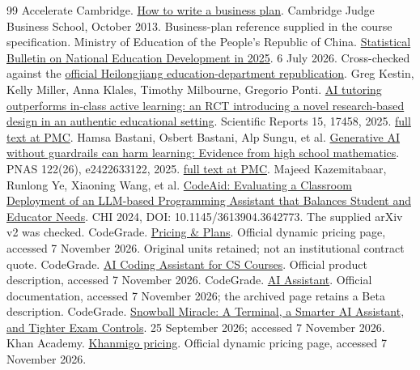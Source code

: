 \begin{thebibliography}{99}
 Accelerate Cambridge. \href{https://www.jbs.cam.ac.uk/wp-content/uploads/2020/08/how-to-write-a-business-plan.pdf}{How to write a business plan}. Cambridge Judge Business School, October 2013. Business-plan reference supplied in the course specification.
 Ministry of Education of the People's Republic of China. \href{https://www.moe.gov.cn/jyb_sjzl/sjzl_fztjgb/202607/t20260706_1442870.html}{Statistical Bulletin on National Education Development in 2025}. 6 July 2026. Cross-checked against the \href{https://jyt.hlj.gov.cn/jyt/c110518/202608/c00_31969727.shtml}{official Heilongjiang education-department republication}.
 Greg Kestin, Kelly Miller, Anna Klales, Timothy Milbourne, Gregorio Ponti. \href{https://doi.org/10.1038/s41598-025-97652-6}{AI tutoring outperforms in-class active learning: an RCT introducing a novel research-based design in an authentic educational setting}. Scientific Reports 15, 17458, 2025. \href{https://pmc.ncbi.nlm.nih.gov/articles/PMC12179260/}{full text at PMC}.
 Hamsa Bastani, Osbert Bastani, Alp Sungu, et al. \href{https://doi.org/10.1073/pnas.2422633122}{Generative AI without guardrails can harm learning: Evidence from high school mathematics}. PNAS 122(26), e2422633122, 2025. \href{https://pmc.ncbi.nlm.nih.gov/articles/PMC12232635/}{full text at PMC}.
 Majeed Kazemitabaar, Runlong Ye, Xiaoning Wang, et al. \href{https://arxiv.org/abs/2401.11314v2}{CodeAid: Evaluating a Classroom Deployment of an LLM-based Programming Assistant that Balances Student and Educator Needs}. CHI 2024, DOI: 10.1145/3613904.3642773. The supplied arXiv v2 was checked.
 CodeGrade. \href{https://www.codegrade.com/pricing}{Pricing \& Plans}. Official dynamic pricing page, accessed 7 November 2026. Original units retained; not an institutional contract quote.
 CodeGrade. \href{https://www.codegrade.com/solutions/ai-assistant}{AI Coding Assistant for CS Courses}. Official product description, accessed 7 November 2026.
 CodeGrade. \href{https://help.codegrade.com/setup-assignment/other-features/ai-assistant}{AI Assistant}. Official documentation, accessed 7 November 2026; the archived page retains a Beta description.
 CodeGrade. \href{https://www.codegrade.com/blog/codegrade-snowball-miracle-release}{Snowball Miracle: A Terminal, a Smarter AI Assistant, and Tighter Exam Controls}. 25 September 2026; accessed 7 November 2026.
 Khan Academy. \href{https://khanmigo.ai/pricing}{Khanmigo pricing}. Official dynamic pricing page, accessed 7 November 2026.

\end{thebibliography}
